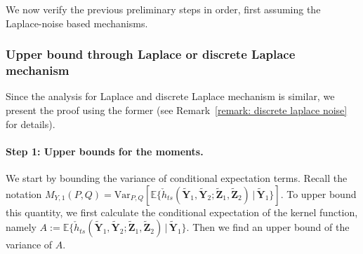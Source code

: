 \documentclass[twoside,11pt]{article}
\newcommand{\rvTwo}{Y}
\newcommand{\vectorize}[1]{\mathbf{#1}}
\newcommand{\vecRandomPrivTwoSampleYNumber}[1]{\tilde{\mathbf{Y}}_{#1}}
\newcommand{\mE}{\mathbb{E}} %
\newcommand{\mVPQ}{\mathrm{Var}_{P,Q}} %
\newcommand{\kernelMoment}{M} %
\newcommand{\dataGenDist}{P}  %
\newcommand{\privacyMechanism}{Q}
\newcommand{\momentTwosampleVarCondexpY}{\kernelMoment_{\rvTwo,1}(\dataGenDist, \privacyMechanism)}
\newcommand{\vecRandomPrivTwoSampleZNumber}[1]{\tilde{\mathbf{Z}}_{#1}}
\newcommand{\kernelTwoSampleSym}{\check{h}_{ts}}
\begin{document}
\begin{appendix}
	We now verify the previous preliminary steps in order, first assuming the Laplace-noise based mechanisms.
	
	\subsubsection{Upper bound through Laplace or discrete Laplace mechanism}\label{proof:multinomial_upper_bound_first_moment}
	Since the analysis for Laplace and discrete Laplace mechanism is similar, we present the proof using the former (see Remark~\ref{remark: discrete laplace noise} for details).
	
	\paragraph{Step 1: Upper bounds for the moments.}
	We start by bounding the variance of conditional expectation terms.
	Recall the notation
	$
	\momentTwosampleVarCondexpY
	=
	\mVPQ[\mE\{ \kernelTwoSampleSym(
	\tilde{\vectorize{\rvTwo}}_1,
	\vecRandomPrivTwoSampleYNumber{2}
	;
	\vecRandomPrivTwoSampleZNumber{1},
	\vecRandomPrivTwoSampleZNumber{2}
	)
	\,|\,
	\tilde{\vectorize{\rvTwo}}_1
	\}]$.
	To upper bound this quantity, we first calculate the conditional expectation of the kernel function, namely
	$A:=\mE\{ \kernelTwoSampleSym(
	\tilde{\vectorize{\rvTwo}}_1,
	\vecRandomPrivTwoSampleYNumber{2}
	;
	\vecRandomPrivTwoSampleZNumber{1},
	\vecRandomPrivTwoSampleZNumber{2}
	)
	\,|\,
	\tilde{\vectorize{\rvTwo}}_1
	\}$.
	Then we find an upper bound of the variance of $A$.
	\\
	

\end{appendix}
\end{document}

